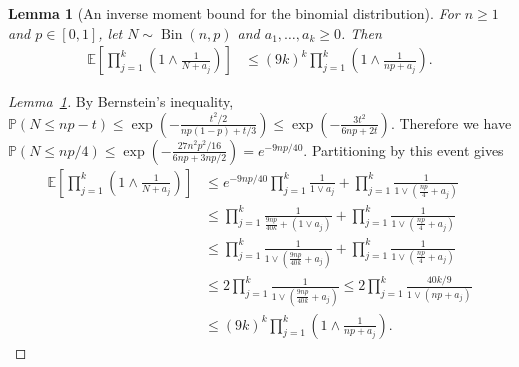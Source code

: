 \documentclass[11pt,lof]{puthesis}
\renewcommand{\P}{\ensuremath{\mathbb{P}}}
\newcommand{\E}{\ensuremath{\mathbb{E}}}
\DeclareMathOperator{\Bin}{Bin}
\theoremstyle{break}
\newtheorem{lemma}{Lemma}[section]
\theoremstyle{proof}
\newtheorem{proof}{Proof}
\begin{document}
\begin{lemma}[An inverse moment bound for the binomial distribution]%
\label{lem:mondrian_app_binomial_bound}
For $n \geq 1$ and $p \in [0,1]$,
let $N \sim \Bin(n, p)$ and $a_1, \ldots, a_k \geq 0$.
Then
%
\begin{align*}
\E\left[
\prod_{j=1}^k
\left(
1 \wedge
\frac{1}{N + a_j}
\right)
\right]
&\leq
(9k)^k
\prod_{j=1}^k
\left(
1 \wedge
\frac{1}{n p + a_j}
\right).
\end{align*}
\end{lemma}

\begin{proof}[Lemma~\ref{lem:mondrian_app_binomial_bound}]
By Bernstein's inequality,
$\P\left( N \leq n p - t \right)
\leq \exp\left(-\frac{t^2/2}{n p(1-p) + t/3}\right)
\leq \exp\left(-\frac{3t^2}{6n p + 2t}\right)$.
Therefore we have
$\P\left( N \leq n p/4 \right)
\leq \exp\left(-\frac{27 n^2 p^2 / 16}{6n p + 3 n p / 2}\right)
= e^{-9 n p / 40}$.
Partitioning by this event gives
%
\begin{align*}
\E\left[
\prod_{j=1}^k
\left(
1 \wedge
\frac{1}{N + a_j}
\right)
\right]
&\leq
e^{-9 n p / 40}
\prod_{j=1}^k
\frac{1}{1 \vee a_j}
+ \prod_{j=1}^k
\frac{1}{1 \vee (\frac{n p}{4} + a_j)} \\
&\leq
\prod_{j=1}^k
\frac{1}{\frac{9 n p}{40k} + (1 \vee a_j)}
+ \prod_{j=1}^k
\frac{1}{1 \vee (\frac{n p}{4} + a_j)} \\
&\leq
\prod_{j=1}^k
\frac{1}{1 \vee \left(\frac{9 n p}{40k} + a_j\right)}
+ \prod_{j=1}^k
\frac{1}{1 \vee (\frac{n p}{4} + a_j)} \\
&\leq
2 \prod_{j=1}^k
\frac{1}{1 \vee \left(\frac{9 n p}{40k} + a_j\right)}
\leq
2 \prod_{j=1}^k
\frac{40k/9}{1 \vee \left(n p + a_j\right)} \\
&\leq
(9k)^k
\prod_{j=1}^k
\left(
1 \wedge
\frac{1}{n p + a_j}
\right).
\end{align*}
\end{proof}
\end{document}
